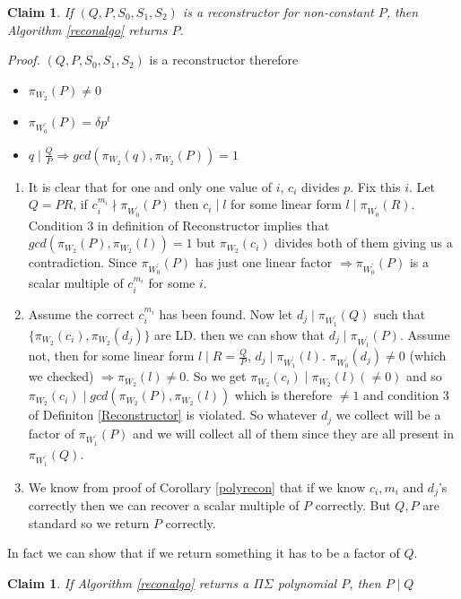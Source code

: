 \documentclass[letterpaper,USenglish,numberwithinsect]{lipics}
\newtheorem{claim}[theorem]{Claim}
\begin{document}
\begin{claim}\label{returnreconalgo}
 If $(Q,P,S_0,S_1,S_2)$ is a reconstructor for non-constant $P$, then Algorithm \ref{reconalgo} returns $P$.
\end{claim}
\emph{Proof.}
$(Q,P,S_0,S_1,S_2)$ is a reconstructor therefore
\begin{itemize}
 \item $\pi_{W_2}(P)\neq 0$
 \item $\pi_{W_0^\prime}(P) = \delta p^t$
 \item $q\mid \frac{Q}{P} \Rightarrow gcd(\pi_{W_2}(q), \pi_{W_2}(P))=1$
\end{itemize}
\begin{enumerate}
\item It is clear that for one and only one value of $i$, $c_i$ divides $p$. Fix this $i$. Let $Q=PR$, if $c_i^{m_i}\nmid \pi_{W_0^\prime}(P)$
 then $c_i \mid l$ for some linear form $l\mid \pi_{W_0^\prime}(R)$. Condition $3$ in definition of Reconstructor implies that
 $gcd(\pi_{W_2}(P),\pi_{W_2}(l))=1$ but $\pi_{W_2}(c_i)$ divides both of them giving us a contradiction. Since $\pi_{W_0^\prime}(P)$
 has just one linear factor $\Rightarrow \pi_{W_0^\prime}(P)$ is
 a scalar multiple of $c_i^{m_i}$ for some $i$.

 \item Assume the correct $c_i^{m_i}$ has been found. Now let $d_j\mid \pi_{W_1^\prime}(Q)$ such that
 $\{\pi_{W_2}(c_i), \pi_{W_2}(d_j)\}$ are LD. then we can show that $d_j\mid \pi_{W_1^\prime}(P)$.
 Assume not, then for some linear form $l\mid R = \frac{Q}{P}$, $d_j\mid \pi_{W_1^\prime}(l)$.
 $\pi_{W_0^\prime}(d_j)\neq 0$ (which we checked) $\Rightarrow \pi_{W_2}(l)\neq 0$. So we get
 $\pi_{W_2}(c_i)\mid \pi_{W_2}(l) (\neq 0)$
 and so $\pi_{W_2}(c_i) \mid gcd(\pi_{W_2}(P),\pi_{W_2}(l))$ which is therefore $\neq 1$ and condition $3$ of Definiton \ref{Reconstructor}
 is violated. So whatever $d_j$ we collect will be a factor of $\pi_{W_1^\prime}(P)$ and we will collect all of them since they are all
 present in $\pi_{W_1^\prime}(Q)$.
 \item We know from proof of Corollary \ref{polyrecon} that if we know $c_i,m_i$ and $d_j$'s correctly then we can recover a
 scalar multiple of $P$ correctly. But $Q,P$ are standard so we return $P$ correctly.
\end{enumerate}


In fact we can show that if we return something it has to be a factor of $Q$.

\begin{claim}\label{reconalgoconverse}
 If Algorithm \ref{reconalgo} returns a $\Pi\Sigma$ polynomial $P$, then $P\mid Q$
\end{claim}
\end{document}
